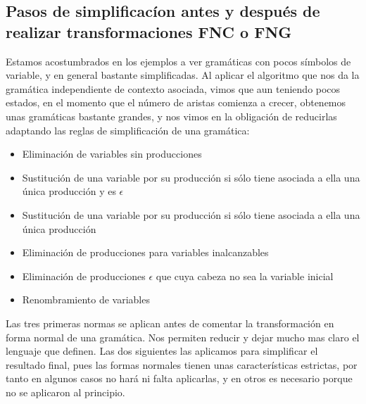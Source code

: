 \documentclass[12pt,a4paper,spanish]{book}
\begin{document}
\subsection{Pasos de simplificac\'ion antes y despu\'es de realizar transformaciones FNC o FNG}
Estamos acostumbrados en los ejemplos a ver gram\'aticas con pocos s\'imbolos de variable, y en general bastante simplificadas. Al aplicar el algoritmo que nos da la gram\'atica independiente de contexto asociada, vimos que aun teniendo pocos estados, en el momento que el n\'umero de aristas comienza a crecer, obtenemos unas gram\'aticas bastante grandes, y nos vimos en la obligaci\'on de reducirlas adaptando las reglas de simplificaci\'on de una gram\'atica:\\
\begin{itemize}
\item Eliminaci\'on de variables sin producciones
\item Sustituci\'on de una variable por su producci\'on si s\'olo tiene asociada a ella una \'unica producci\'on y es $\epsilon$
\item Sustituci\'on de una variable por su producci\'on si s\'olo tiene asociada a ella una \'unica producci\'on
\item Eliminaci\'on de producciones para variables inalcanzables
\item Eliminaci\'on de producciones $\epsilon$ que cuya cabeza no sea la variable inicial\\
\item Renombramiento de variables
\end{itemize}
Las tres primeras normas se aplican antes de comentar la transformaci\'on en forma normal de una gram\'atica. Nos permiten reducir y dejar mucho mas claro el lenguaje que definen. Las dos siguientes las aplicamos para simplificar el resultado final, pues las formas normales tienen unas caracter\'isticas estrictas, por tanto en algunos casos no har\'a ni falta aplicarlas, y en otros es necesario porque no se aplicaron al principio.
\end{document}
